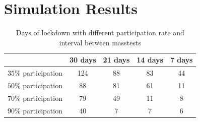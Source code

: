 \documentclass
[
    a4paper,
    11pt,
    bibliography = totoc,
    listof = totoc,
    headinclude = true,
]
{scrbook}
\begin{document}
\chapter{Simulation Results}

\begin{table}[!h]
{\small%
\begin{center}
\begin{tabular}{|c||c|c|c|c|}
 \hline
 & 30 days    & 21 days   & 14 days  & 7 days  \\
  \hline
  \hline
      $35\%$ participation    & 124 &  88&  83  & 44   \\
  \hline
      $50\%$ participation & 88 & 81 & 61 & 11 \\
  \hline
      $70\%$ participation & 79 &  49 & 11 & 8 \\
  \hline
      $90\%$ participation & 40 &7 &7  & 6\\
      \hline
\end{tabular}
\end{center}
}%

\caption{Days of lockdown with different participation rate and interval between masstests}
\end{table}
\end{document}

